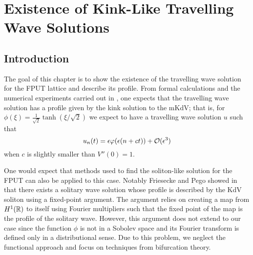 \chapter{Existence of Kink-Like Travelling Wave Solutions}
\label{chp:existence}
\pagestyle{myheadings}

\section{Introduction}
The goal of this chapter is to show the existence of the travelling wave solution for the FPUT lattice and describe its profile. From formal calculations and the numerical experiments carried out in \cite{pace2019beta}, one expects that the travelling wave solution has a profile given by the kink solution to the mKdV; that is, for \(\phi(\xi) = \frac 1 {\sqrt 2} \tanh(\xi/\sqrt 2)\) we expect to have a travelling wave solution \(u\) such that 
\begin{equation}\label{formal-approximation}
	u_n(t) = \epsilon \varphi(\epsilon(n + ct)) +\mathcal{O}(\epsilon^3)
\end{equation}
when \(c\) is slightly smaller than \(V''(0) = 1\).

One would expect that methods used to find the soliton-like solution for the FPUT can also be applied to this case. Notably Friesecke and Pego showed in \cite{friesecke1999solitary} that there exists a solitary wave solution whose profile is described by the KdV soliton using a fixed-point argument. The argument relies on creating a map from \(H^1(\mathbb{R})\) to itself using Fourier multipliers such that the fixed point of the map is the profile of the solitary wave. However, this argument does not extend to our case since the function \(\phi\) is not in a Sobolev space and its Fourier transform is defined only in a distributional sense. Due to this problem, we neglect the functional approach and focus on techniques from bifurcation theory. 


